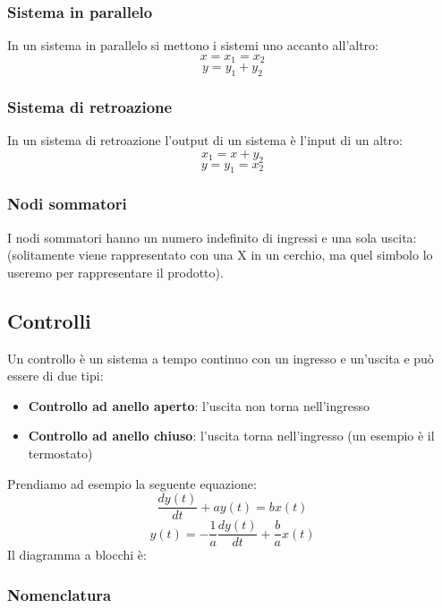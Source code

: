 \documentclass[a4paper]{article}
\begin{document}
\subsubsection{Sistema in parallelo}
In un sistema in parallelo si mettono i sistemi uno accanto all'altro:
\label{25-11-D1}
\[
  x = x_1 = x_2
\]
\[
  y = y_1 + y_2
\] 

\subsubsection{Sistema di retroazione}
In un sistema di retroazione l'output di un sistema è l'input di un altro:
\label{25-11-D2}
\[
  x_1 = x + y_2
\] 
\[
  y = y_1 = x_2
\] 

\subsubsection{Nodi sommatori}
I nodi sommatori hanno un numero indefinito di ingressi e una sola uscita:
\label{25-11-D3}
\noindent
(solitamente viene rappresentato con una X in un cerchio, ma quel simbolo lo useremo
per rappresentare il prodotto).

\subsection{Controlli}
Un controllo è un sistema a tempo continuo con un ingresso e un'uscita e può essere di 
due tipi:
\begin{itemize}
  \item \textbf{Controllo ad anello aperto}: l'uscita non torna nell'ingresso
    \label{25-11-D4}

  \item \textbf{Controllo ad anello chiuso}: l'uscita torna nell'ingresso
    \label{25-11-D5}
    \noindent
    (un esempio è il termostato)
\end{itemize}

\begin{example}
  Prendiamo ad esempio la seguente equazione:
  \[
    \frac{dy(t)}{dt} + ay(t) = bx(t)
  \] 
  \[
    y(t) = -\frac{1}{a} \frac{dy(t)}{dt} + \frac{b}{a} x(t)
  \] 
  Il diagramma a blocchi è:
  \label{25-11-D6}
\end{example}

\subsubsection{Nomenclatura}
\label{25-11-D7}
\end{document}

